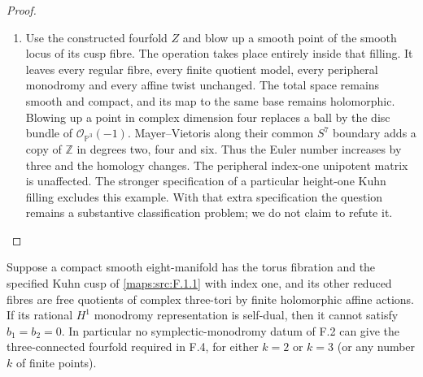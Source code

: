 \begin{proof}
\begin{enumerate}[label=\arabic*.]
\item Use the constructed fourfold $Z$ and blow up a smooth point
of the smooth locus of its cusp fibre.  The operation takes
place entirely inside that filling.  It leaves every regular
fibre, every finite quotient model, every peripheral monodromy
and every affine twist unchanged.  The total space remains
smooth and compact, and its map to the same base remains
holomorphic.  Blowing up a point in complex dimension four
replaces a ball by the disc bundle of $\mathcal O_{\mathbb P^3}(-1)$.
Mayer--Vietoris along their common $S^7$ boundary adds a copy
of $\mathbb Z$ in degrees two, four and six.  Thus the Euler
number increases by three and the homology changes.  The
peripheral index-one unipotent matrix is unaffected.
The stronger specification of a particular height-one Kuhn
filling excludes this example.  With that extra specification
the question remains a substantive classification problem;
we do not claim to refute it.

\end{enumerate}
\end{proof}




\begin{theorem}\label{maps:src:F.3.1}


Suppose a compact smooth eight-manifold has the torus fibration
and the specified Kuhn cusp of \ref{maps:src:F.1.1} with index one, and its
other reduced fibres are free quotients of complex three-tori
by finite holomorphic affine actions.  If its rational
$H^1$ monodromy representation is self-dual, then it cannot
satisfy $b_1=b_2=0$.  In particular no symplectic-monodromy
datum of F.2 can give the three-connected fourfold required
in F.4, for either $k=2$ or $k=3$ (or any number $k$ of finite
points).

\end{theorem}



